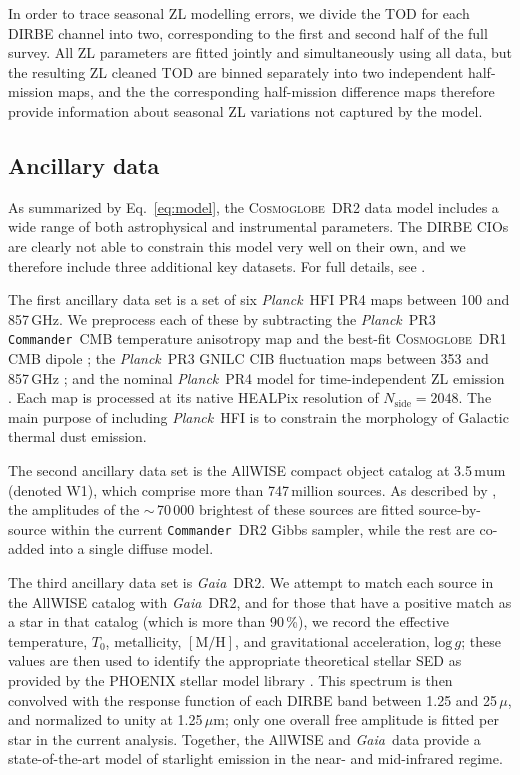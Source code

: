 \documentclass[twocolumn]{aa}
\def\commander{\texttt{Commander}}
\def\Planck{\textit{Planck}}
\def\GAIA{\textit{Gaia}}
\newcommand{\cosmoglobe}{\textsc{Cosmoglobe}}
\begin{document}
In order to trace seasonal ZL modelling errors, we divide the TOD for
each DIRBE channel into two, corresponding to the first and second
half of the full survey. All ZL parameters are fitted jointly and
simultaneously using all data, but the resulting ZL cleaned TOD are
binned separately into two independent half-mission maps, and the the
corresponding half-mission difference maps therefore provide
information about seasonal ZL variations not captured by the model.

\subsection{Ancillary data}

As summarized by Eq.~\eqref{eq:model}, the \cosmoglobe\ DR2 data model
includes a wide range of both astrophysical and instrumental
parameters. The DIRBE CIOs are clearly not able to constrain this
model very well on their own, and we therefore include three
additional key datasets. For full details, see
\citet{CG02_01,CG02_03,CG02_04,CG02_05}.

The first ancillary data set is a set of six \Planck\ HFI PR4 maps
between 100 and 857\,GHz. We preprocess each of these by subtracting
the \Planck\ PR3 \commander\ CMB temperature anisotropy map
\citep{planck2014-a12} and the best-fit \cosmoglobe\ DR1 CMB dipole
\citep{Watts2023}; the \Planck\ PR3 GNILC CIB fluctuation maps between
353 and 857\,GHz \citep{gnilc_cib}; and the nominal \Planck\ PR4 model
for time-independent ZL emission \citep{npipe}. Each map is processed
at its native HEALPix resolution of $N_{\mathrm{side}}=2048$. The main
purpose of including \Planck\ HFI is to constrain the morphology of
Galactic thermal dust emission.

The second ancillary data set is the AllWISE
\citep{wright:2010,allwise_ES} compact object catalog at
3.5$\,\mathrm{mu}$m (denoted W1), which comprise more than
747\,million sources. As described by \citet{CG02_04}, the amplitudes
of the $\sim$\,70\,000 brightest of these sources are fitted
source-by-source within the current \commander\ DR2 Gibbs sampler,
while the rest are co-added into a single diffuse model.

The third ancillary data set is \GAIA\ DR2. We attempt to match each
source in the AllWISE catalog with \GAIA\ DR2, and for those that have a
positive match as a star in that catalog (which is more than 90\,\%),
we record the effective temperature, $T_0$, metallicity,
$[\mathrm{M}/\mathrm{H}]$, and gravitational acceleration,
$\mathrm{log}\,g$; these values are then used to identify the
appropriate theoretical stellar SED as provided by the PHOENIX stellar
model library \citep{husser:2013}. This spectrum is then convolved
with the response function of each DIRBE band between 1.25 and
25\,$\mu$, and normalized to unity at 1.25\,$\mu$m; only one overall
free amplitude is fitted per star in the current analysis. Together,
the AllWISE and \GAIA\ data provide a state-of-the-art model of
starlight emission in the near- and mid-infrared regime.
\end{document}

